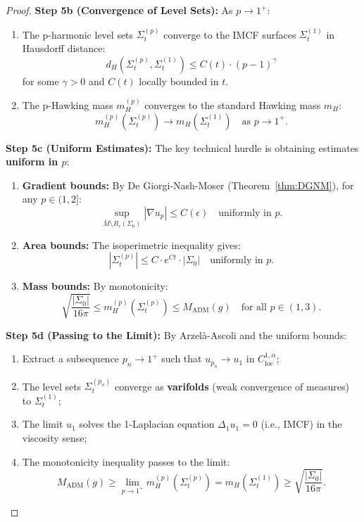\begin{proof}
\textbf{Step 5b (Convergence of Level Sets):} As $p \to 1^+$:
\begin{enumerate}
\item The p-harmonic level sets $\Sigma_t^{(p)}$ converge to the IMCF surfaces $\Sigma_t^{(1)}$ in Hausdorff distance:
\begin{equation}
d_H(\Sigma_t^{(p)}, \Sigma_t^{(1)}) \leq C(t) \cdot (p-1)^\gamma
\end{equation}
for some $\gamma > 0$ and $C(t)$ locally bounded in $t$.

\item The p-Hawking mass $m_H^{(p)}$ converges to the standard Hawking mass $m_H$:
\begin{equation}
m_H^{(p)}(\Sigma_t^{(p)}) \to m_H(\Sigma_t^{(1)}) \quad \text{as } p \to 1^+.
\end{equation}
\end{enumerate}

\textbf{Step 5c (Uniform Estimates):} The key technical hurdle is obtaining estimates \textbf{uniform in $p$}:
\begin{enumerate}
\item \textbf{Gradient bounds:} By De Giorgi-Nash-Moser (Theorem~\ref{thm:DGNM}), for any $p \in (1, 2]$:
\begin{equation}
\sup_{\bar{M} \setminus B_\epsilon(\Sigma_0)} |\nabla u_p| \leq C(\epsilon) \quad \text{uniformly in } p.
\end{equation}

\item \textbf{Area bounds:} The isoperimetric inequality gives:
\begin{equation}
|\Sigma_t^{(p)}| \leq C \cdot e^{Ct} \cdot |\Sigma_0| \quad \text{uniformly in } p.
\end{equation}

\item \textbf{Mass bounds:} By monotonicity:
\begin{equation}
\sqrt{\frac{|\Sigma_0|}{16\pi}} \leq m_H^{(p)}(\Sigma_t^{(p)}) \leq M_{\mathrm{ADM}}(g) \quad \text{for all } p \in (1, 3).
\end{equation}
\end{enumerate}

\textbf{Step 5d (Passing to the Limit):} By Arzel\`a-Ascoli and the uniform bounds:
\begin{enumerate}
\item Extract a subsequence $p_n \to 1^+$ such that $u_{p_n} \to u_1$ in $C^{1,\alpha}_{\mathrm{loc}}$;
\item The level sets $\Sigma_t^{(p_n)}$ converge as \textbf{varifolds} (weak convergence of measures) to $\Sigma_t^{(1)}$;
\item The limit $u_1$ solves the 1-Laplacian equation $\Delta_1 u_1 = 0$ (i.e., IMCF) in the viscosity sense;
\item The monotonicity inequality passes to the limit:
\begin{equation}
M_{\mathrm{ADM}}(g) \geq \lim_{p \to 1^+} m_H^{(p)}(\Sigma_t^{(p)}) = m_H(\Sigma_t^{(1)}) \geq \sqrt{\frac{|\Sigma_0|}{16\pi}}.
\end{equation}
\end{enumerate}


\end{proof}
